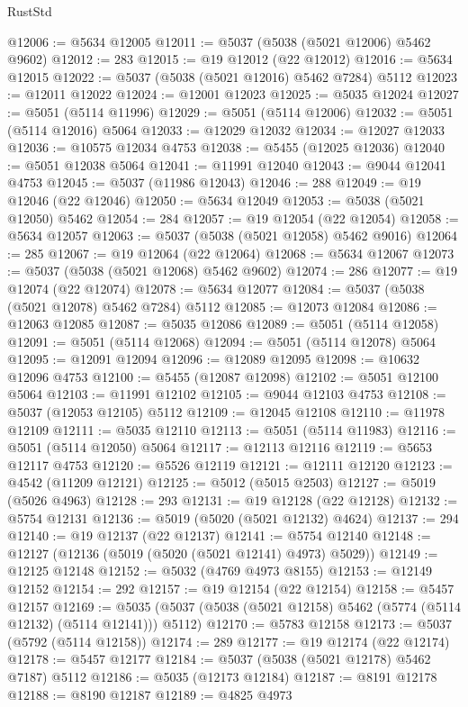 \begin{lexlean}{RustStd}
\begin{coremodule}
@12006 := @5634 @12005
@12011 := @5037 (@5038 (@5021 @12006) @5462 @9602)
@12012 := 283
@12015 := @19 @12012 (@22 @12012)
@12016 := @5634 @12015
@12022 := @5037 (@5038 (@5021 @12016) @5462 @7284) @5112
@12023 := @12011 @12022
@12024 := @12001 @12023
@12025 := @5035 @12024
@12027 := @5051 (@5114 @11996)
@12029 := @5051 (@5114 @12006)
@12032 := @5051 (@5114 @12016) @5064
@12033 := @12029 @12032
@12034 := @12027 @12033
@12036 := @10575 @12034 @4753
@12038 := @5455 (@12025 @12036)
@12040 := @5051 @12038 @5064
@12041 := @11991 @12040
@12043 := @9044 @12041 @4753
@12045 := @5037 (@11986 @12043)
@12046 := 288
@12049 := @19 @12046 (@22 @12046)
@12050 := @5634 @12049
@12053 := @5038 (@5021 @12050) @5462
@12054 := 284
@12057 := @19 @12054 (@22 @12054)
@12058 := @5634 @12057
@12063 := @5037 (@5038 (@5021 @12058) @5462 @9016)
@12064 := 285
@12067 := @19 @12064 (@22 @12064)
@12068 := @5634 @12067
@12073 := @5037 (@5038 (@5021 @12068) @5462 @9602)
@12074 := 286
@12077 := @19 @12074 (@22 @12074)
@12078 := @5634 @12077
@12084 := @5037 (@5038 (@5021 @12078) @5462 @7284) @5112
@12085 := @12073 @12084
@12086 := @12063 @12085
@12087 := @5035 @12086
@12089 := @5051 (@5114 @12058)
@12091 := @5051 (@5114 @12068)
@12094 := @5051 (@5114 @12078) @5064
@12095 := @12091 @12094
@12096 := @12089 @12095
@12098 := @10632 @12096 @4753
@12100 := @5455 (@12087 @12098)
@12102 := @5051 @12100 @5064
@12103 := @11991 @12102
@12105 := @9044 @12103 @4753
@12108 := @5037 (@12053 @12105) @5112
@12109 := @12045 @12108
@12110 := @11978 @12109
@12111 := @5035 @12110
@12113 := @5051 (@5114 @11983)
@12116 := @5051 (@5114 @12050) @5064
@12117 := @12113 @12116
@12119 := @5653 @12117 @4753
@12120 := @5526 @12119
@12121 := @12111 @12120
@12123 := @4542 (@11209 @12121)
@12125 := @5012 (@5015 @2503)
@12127 := @5019 (@5026 @4963)
@12128 := 293
@12131 := @19 @12128 (@22 @12128)
@12132 := @5754 @12131
@12136 := @5019 (@5020 (@5021 @12132) @4624)
@12137 := 294
@12140 := @19 @12137 (@22 @12137)
@12141 := @5754 @12140
@12148 := @12127 (@12136 (@5019 (@5020 (@5021 @12141) @4973) @5029))
@12149 := @12125 @12148
@12152 := @5032 (@4769 @4973 @8155)
@12153 := @12149 @12152
@12154 := 292
@12157 := @19 @12154 (@22 @12154)
@12158 := @5457 @12157
@12169 := @5035 (@5037 (@5038 (@5021 @12158) @5462 (@5774 (@5114 @12132) (@5114 @12141))) @5112)
@12170 := @5783 @12158
@12173 := @5037 (@5792 (@5114 @12158))
@12174 := 289
@12177 := @19 @12174 (@22 @12174)
@12178 := @5457 @12177
@12184 := @5037 (@5038 (@5021 @12178) @5462 @7187) @5112
@12186 := @5035 (@12173 @12184)
@12187 := @8191 @12178
@12188 := @8190 @12187
@12189 := @4825 @4973

\end{coremodule}
\end{lexlean}
